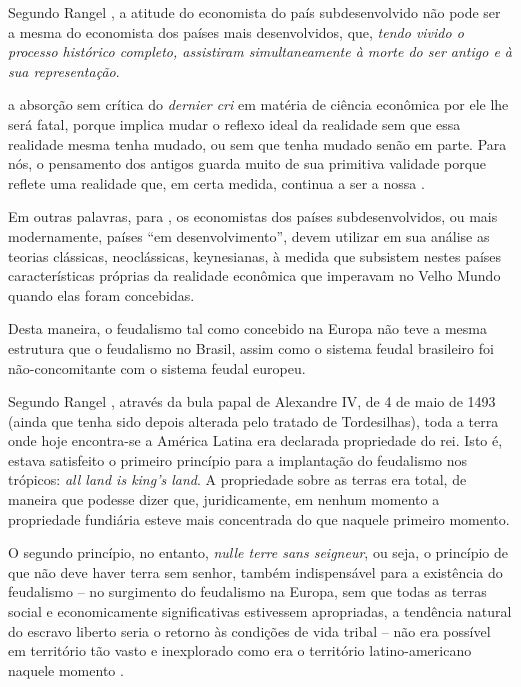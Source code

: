 \documentclass[
	12pt,				%
	oneside,			%
	a4paper,			%
	chapter=TITLE,		%
	section=TITLE,		%
	english,			%
	brazil				%
	]{abntex2}
\begin{document}
Segundo Rangel \autocite*[206]{rangel1956}, a atitude do economista do país
subdesenvolvido não pode ser a mesma do economista dos países mais
desenvolvidos, que, \emph{tendo vivido o processo histórico completo, assistiram
simultaneamente à morte do ser antigo e à sua representação}.
\begin{citacao} 
a absorção sem crítica do \emph{dernier cri} em matéria de ciência econômica por
ele lhe será fatal, porque implica mudar o reflexo ideal da realidade sem que
essa realidade mesma tenha mudado, ou sem que tenha mudado senão em parte. Para
nós, o pensamento dos antigos guarda muito de sua primitiva validade porque
reflete uma realidade que, em certa medida, continua a ser a nossa
\cite[p.~206-207]{rangel1956}.
\end{citacao}
Em outras palavras, para \textcite{rangel1956}, os economistas dos países
subdesenvolvidos, ou mais modernamente, países ``em desenvolvimento'', devem
utilizar em sua análise as teorias clássicas, neoclássicas, keynesianas, à
medida que subsistem nestes países características próprias da realidade
econômica que imperavam no Velho Mundo quando elas foram concebidas.

Desta maneira, o feudalismo tal como concebido na Europa não teve a mesma
estrutura que o feudalismo no Brasil, assim como o sistema feudal brasileiro foi
não-concomitante com o sistema feudal europeu.

Segundo Rangel \autocite*[726]{rangel1989}, através da bula papal de Alexandre IV, de
4 de maio de 1493 (ainda que tenha sido depois alterada pelo tratado de
Tordesilhas), toda a terra onde hoje encontra-se a América Latina era declarada
propriedade do rei. Isto é, estava satisfeito o primeiro princípio para a
implantação do feudalismo nos trópicos: \emph{all land is king's land}. A propriedade
sobre as terras era total, de maneira que podesse dizer que, juridicamente, em
nenhum momento a propriedade fundiária esteve mais concentrada do que naquele
primeiro momento.

O segundo princípio, no entanto, \emph{nulle terre sans seigneur}, ou seja, o
princípio de que não deve haver terra sem senhor, também indispensável para a
existência do feudalismo -- no surgimento do feudalismo na Europa, sem que todas
as terras social e economicamente significativas estivessem apropriadas, a
tendência natural do escravo liberto seria o retorno às condições de vida
tribal -- não era possível em território tão vasto e inexplorado como era o
território latino-americano naquele momento \autocite[726]{rangel1989}.
\end{document}

